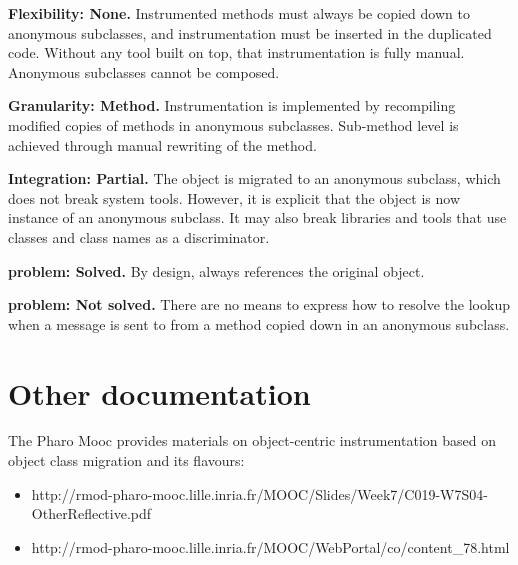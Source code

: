 \documentclass[10pt,twoside,english]{_support/latex/sbabook/sbabook}
\begin{document}
\textbf{Flexibility: None.} Instrumented methods must always be copied down to anonymous subclasses, and instrumentation must be inserted in the duplicated code. Without any tool built on top, that instrumentation is fully manual. Anonymous subclasses cannot be composed.

\textbf{Granularity: Method.} Instrumentation is implemented by recompiling modified copies of methods in anonymous subclasses. Sub-method level is achieved through manual rewriting of the method.

\textbf{Integration: Partial.} The object is migrated to an anonymous subclass, which does not break system tools. However, it is explicit that the object is now instance of an anonymous subclass. It may also break libraries and tools that use classes and class names as a discriminator.

\textbf{ problem: Solved.} By design,  always references the original object.

\textbf{ problem: Not solved.} There are no means to express how to resolve the lookup when a message is sent to  from a method copied down in an anonymous subclass.
\section{Other documentation}
The Pharo Mooc provides materials on object-centric instrumentation based on object class migration and its flavours:

\begin{itemize}
\item http://rmod-pharo-mooc.lille.inria.fr/MOOC/Slides/Week7/C019-W7S04-OtherReflective.pdf
\item http://rmod-pharo-mooc.lille.inria.fr/MOOC/WebPortal/co/content\_78.html
\end{itemize}






\backmatter

\end{document}
